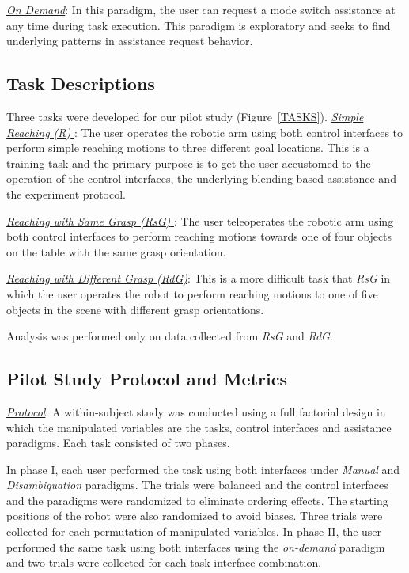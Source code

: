 \documentclass[conference]{IEEEtran}
\begin{document}
 \noindent\underline{\textit{On Demand}}: In this paradigm, the user can request a mode switch assistance at any time during task execution. This paradigm is exploratory and seeks to find underlying patterns in assistance request behavior.
 
 \subsection{Task Descriptions}
 Three tasks were developed for our pilot study (Figure~\ref{TASKS}).
 \noindent\underline{\textit{Simple Reaching (R)} }: The user operates the robotic arm using both control interfaces to perform simple reaching motions to three different goal locations. This is a training task and the primary purpose is to get the user accustomed to the operation of the control interfaces, the underlying blending based assistance and the experiment protocol. 
 
 \noindent\underline{\textit{Reaching with Same Grasp (RsG)} }: The user teleoperates the robotic arm using both control interfaces to perform reaching motions towards one of four objects on the table with the same grasp orientation.
 
 \noindent\underline{\textit{Reaching with Different Grasp (RdG)}}: This is a more difficult task that \textit{RsG} in which the user operates the robot to perform reaching motions to one of five objects in the scene with different grasp orientations.
 
 Analysis was performed only on data collected from \textit{RsG} and \textit{RdG}.  
 




\subsection{Pilot Study Protocol and Metrics}

\noindent\underline{\textit{Protocol}}:
A within-subject study was conducted using a full factorial design in which the manipulated variables are the tasks, control interfaces and assistance paradigms. Each task consisted of two phases. 

In phase I, each user performed the task using both interfaces under \textit{Manual} and \textit{Disambiguation} paradigms. The trials were balanced and the control interfaces and the paradigms were randomized to eliminate ordering effects. The starting positions of the robot were also randomized to avoid biases. Three trials were collected for each permutation of manipulated variables. 
In phase II, the user performed the same task using both interfaces using the \textit{on-demand} paradigm and two trials were collected for each task-interface combination.  
\end{document}
